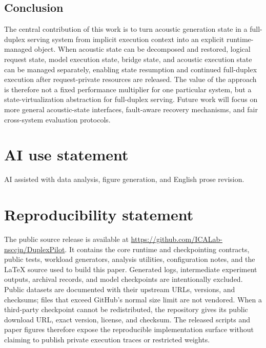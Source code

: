 \documentclass{article}
\begin{document}
\subsection{Conclusion}
\label{sec:conclusion}

The central contribution of this work is to turn acoustic generation
state in a full-duplex serving system from implicit execution context
into an explicit runtime-managed object. When acoustic state can be
decomposed and restored, logical request state, model execution state,
bridge state, and acoustic execution state can be managed separately,
enabling state resumption and continued full-duplex execution after
request-private resources are released. The value of the approach is
therefore not a fixed performance multiplier for one particular system,
but a state-virtualization abstraction for full-duplex serving. Future
work will focus on more general acoustic-state interfaces,
fault-aware recovery mechanisms, and fair cross-system evaluation
protocols.

\section*{AI use statement}
AI assisted with data analysis, figure generation, and English prose revision.

\section*{Reproducibility statement}
The public source release is available at
\url{https://github.com/ICALab-nsccjn/DuplexPilot}. It contains the core
runtime and checkpointing contracts, public tests, workload generators,
analysis utilities, configuration notes, and the LaTeX source used to build
this paper. Generated logs, intermediate experiment outputs, archival
records, and model checkpoints are intentionally excluded. Public datasets
are documented with their upstream URLs, versions, and checksums; files that
exceed GitHub's normal size limit are not vendored. When a third-party
checkpoint cannot be redistributed, the repository gives its public download
URL, exact version, license, and checksum. The released scripts and paper
figures therefore expose the reproducible implementation surface without
claiming to publish private execution traces or restricted weights.




\clearpage
\appendix

\end{document}
